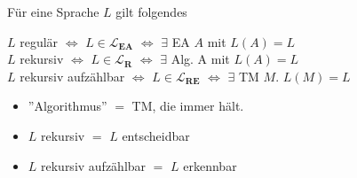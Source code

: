     
    

        Für eine Sprache $L$ gilt folgendes
        \begin{center}
            $L$ regulär $\iff $ $L \in \mathbf{\mathcal{L}_{\textbf{EA}}}$ $\iff$ $\exists$ EA $A$ mit $L(A) = L$\\
            $L$ rekursiv $\iff$ $L \in \mathbf{\mathcal{L}_{\textbf{R}}}$ $\iff$ $\exists$ Alg. A mit $L(A) = L$\\
            $L$ rekursiv aufzählbar $\iff$ $L \in \mathbf{\mathcal{L}_{\textbf{RE}}}$ $\iff$ $\exists$ TM $M$. $L(M) = L$
        \end{center}
        \begin{itemize}
            \item  ''Algorithmus'' $=$ TM, die immer hält.
            \item $L$ rekursiv $=$ $L$ entscheidbar
            \item $L$ rekursiv aufzählbar $=$ $L$ erkennbar
        \end{itemize}
       
